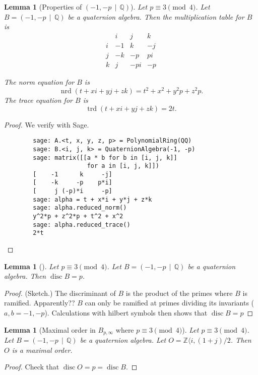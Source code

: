 \documentclass[10pt]{article}
\theoremstyle{plain}
\newtheorem{lemma}[theorem]{Lemma}
\theoremstyle{definition}
\newcommand{\op}{\operatorname}
\newcommand{\Z}{\mathbb{Z}}
\newcommand{\Q}{\mathbb{Q}}
\newcommand{\nrd}{\op{nrd}}
\newcommand{\trd}{\op{trd}}
\newcommand{\disc}{\op{disc}}
\begin{document}
\begin{lemma}[Properties of \( (-1, -p \, \mid \, \Q) \)]
    Let \( p \equiv 3 \pmod{4} \).
    Let \( B =  (-1, -p \, \mid \, \Q) \) be a quaternion algebra.
    Then the multiplication table for \( B \) is
    \[
        \begin{array}{c|ccc}
              & i  & j   & k  \\
            \hline
            i & -1 & k   & -j \\
            j & -k & -p  & pi \\
            k & j  & -pi & -p
        \end{array}
    \]

    The norm equation for \( B \) is
    \[
        \nrd(t + xi + yj + zk) = t^2 + x^2 + y^2p + z^2p.
    \]
    The trace equation for \( B \) is
    \[
        \trd(t + xi + yj + zk) = 2t.
    \]
\end{lemma}
\begin{proof}
    We verify with Sage.
    \begin{lstlisting}
        sage: A.<t, x, y, z, p> = PolynomialRing(QQ)
        sage: B.<i, j, k> = QuaternionAlgebra(-1, -p)
        sage: matrix([[a * b for b in [i, j, k]]
                       for a in [i, j, k]])
        [    -1      k     -j]
        [    -k     -p    p*i]
        [     j (-p)*i     -p]
        sage: alpha = t + x*i + y*j + z*k
        sage: alpha.reduced_norm()
        y^2*p + z^2*p + t^2 + x^2
        sage: alpha.reduced_trace()
        2*t
    \end{lstlisting}
\end{proof}

\begin{lemma}[]
    Let \( p \equiv 3 \pmod{4} \).
    Let \( B =  (-1, -p \, \mid \, \Q) \) be a quaternion algebra.
    Then \( \disc B = p \).
\end{lemma}
\begin{proof}
    (Sketch.)
    The discriminant of \( B \) is the product of the primes where \( B \) is ramified.
    Apparently?? \( B \) can only be ramified at primes dividing its invariants (\( a, b = -1, -p\)).
    Calculations with hilbert symbols then shows that \( \disc B = p \)
\end{proof}

\begin{lemma}[Maximal order in \( B_{p, \infty} \) where \( p \equiv 3 \pmod{4} \)]
    Let \( p \equiv 3 \pmod{4} \).
    Let \( B =  (-1, -p \, \mid \, \Q) \) be a quaternion algebra.
    Let \( O = \Z \langle i, (1+j) / 2 \).
    Then \( O \) is a maximal order.
\end{lemma}
\begin{proof}
    Check that \( \disc O  = p = \disc B\).
\end{proof}
\end{document}
